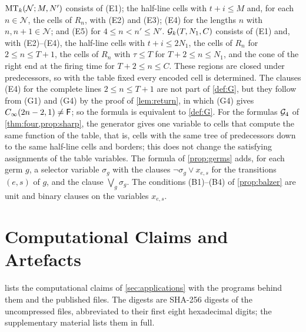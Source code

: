 $\mathrm{MT}_k(\mathcal N;M,N')$ consists of (E1); the half-line cells with $t+i\le M$
and, for each $n\in\mathcal N$, the cells of $R_n$, with (E2) and (E3); (E4) for
the lengths $n$ with $n,n+1\in\mathcal N$; and (E5) for $4\le n<n'\le N'$.
$\mathcal G_k(T,N_1,C)$ consists of (E1) and, with (E2)--(E4), the half-line cells with
$t+i\le 2N_1$, the cells of $R_n$ for $2\le n\le T+1$, the cells of $R_n$ with
$\tau\le T$ for $T+2\le n\le N_1$, and the cone of the right end at the firing
time for $T+2\le n\le C$. These regions are closed under predecessors, so with
the table fixed every encoded cell is determined. The clauses (E4) for the
complete lines $2\le n\le T+1$ are not part of \cref{def:G}, but they follow from
(G1) and (G4) by the proof of \cref{lem:return}, in which (G4) gives
$C_\infty(2n-2,1)\ne\mathsf F$; so the formula is equivalent to \cref{def:G}. For the
formulas $\mathcal G_4$ of \cref{thm:four,prop:sharp}, the generator gives one variable
to cells that compute the same function of the table, that is, cells with the
same tree of predecessors down to the same half-line cells and borders; this
does not change the satisfying assignments of the table variables. The formula
of \cref{prop:germs} adds, for each germ $g$, a selector variable $\sigma_g$
with the clauses $\neg\sigma_g\vee x_{e,s}$ for the transitions $(e,s)$ of $g$,
and the clause $\bigvee_g\sigma_g$. The conditions (B1)--(B4) of \cref{prop:balzer} are unit and
binary clauses on the variables $x_{e,s}$.

\section{Computational Claims and Artefacts}\label{app:artefacts}

 lists the computational claims of
\cref{sec:applications} with the programs behind them and the published files.
The digests are SHA-256 digests of the uncompressed files, abbreviated to their
first eight hexadecimal digits; the supplementary material lists them in full.

